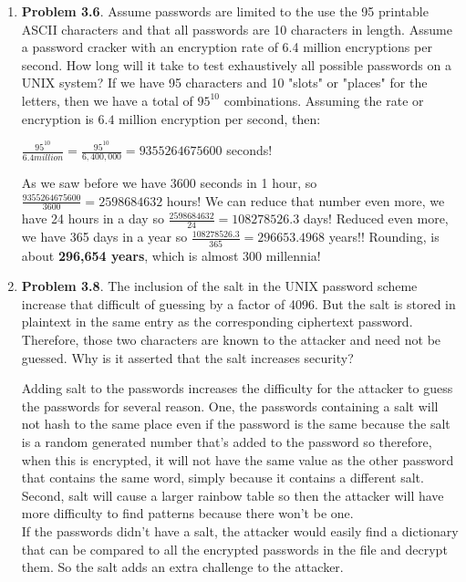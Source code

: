 \documentclass[12pt]{article}
\begin{document}
\begin{enumerate}
	
	\item {\textbf{Problem 3.6}. Assume passwords are limited to the use the 95 printable ASCII characters and that all passwords are 10 characters in length. Assume a password cracker with an encryption rate of 6.4 million encryptions per second. How long will it take to test exhaustively all possible passwords on a UNIX system?}
If we have 95 characters and 10 "slots" or "places" for the letters, then we have a total of $95^{10}$ combinations. Assuming the rate or encryption is $6.4$ million encryption per second, then: \\ \begin{center} $\frac{95^{10}}{6.4million} = \frac{95^{10}}{6,400,000} = 9355264675600$  seconds! \end{center} As we saw before we have 3600 seconds in 1 hour, so $\frac{9355264675600}{3600} = 2598684632$ hours! We can reduce that number even more, we have 24 hours in a day so $\frac{2598684632}{24} = 108278526.3$ days! Reduced even more, we have 365 days in a year so  $\frac{108278526.3}{365} = 296653.4968$ years!! Rounding, is about \textbf{296,654 years}, which is almost 300 millennia! 
			
		\vspace{10pt}
	
	
	\item {\textbf{Problem 3.8}. The inclusion of the salt in the UNIX password scheme increase that difficult of guessing by a factor of 4096. But the salt is stored in plaintext in the same entry as the corresponding ciphertext password. Therefore, those two characters are known to the attacker and need not be guessed. Why is it asserted that the salt increases security?} 
	  
	Adding salt to the passwords increases the difficulty for the attacker to guess the passwords for several reason. One, the passwords containing a salt will not hash to the same place even if the password is the same because the salt is a random generated number that's added to the password so therefore, when this is encrypted, it will not have the same value as the other password that contains the same word, simply because it contains a different salt. Second, salt will cause a larger rainbow table so then the attacker will have more difficulty to find patterns because there won't be one. \\ If the passwords didn't have a salt, the attacker would easily find a dictionary that can be compared to all the encrypted passwords in the file and decrypt them. So the salt adds an extra challenge to the attacker. 
	


\end{enumerate}
\end{document}
